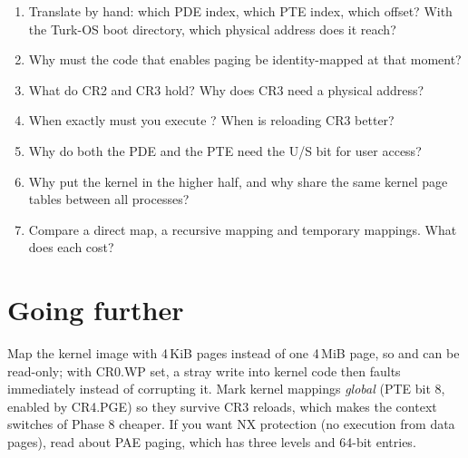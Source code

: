 \documentclass[11pt,a4paper]{article}
\begin{document}
\begin{questionbox}
\begin{enumerate}
  \item Translate  by hand: which PDE index, which PTE index, which offset? With the Turk-OS boot directory, which physical address does it reach?
  \item Why must the code that enables paging be identity-mapped at that moment?
  \item What do CR2 and CR3 hold? Why does CR3 need a physical address?
  \item When exactly must you execute ? When is reloading CR3 better?
  \item Why do both the PDE and the PTE need the U/S bit for user access?
  \item Why put the kernel in the higher half, and why share the same kernel page tables between all processes?
  \item Compare a direct map, a recursive mapping and temporary mappings. What does each cost?
\end{enumerate}
\end{questionbox}

\section{Going further}

Map the kernel image with 4\,KiB pages instead of one 4\,MiB page, so  and  can be read-only;
with CR0.WP set, a stray write into kernel code then faults immediately instead of corrupting it. Mark kernel mappings
\emph{global} (PTE bit 8, enabled by CR4.PGE) so they survive CR3 reloads, which makes the context switches of Phase 8
cheaper. If you want NX protection (no execution from data pages), read about PAE paging, which has three levels and
64-bit entries.

\booklegend
\end{document}
